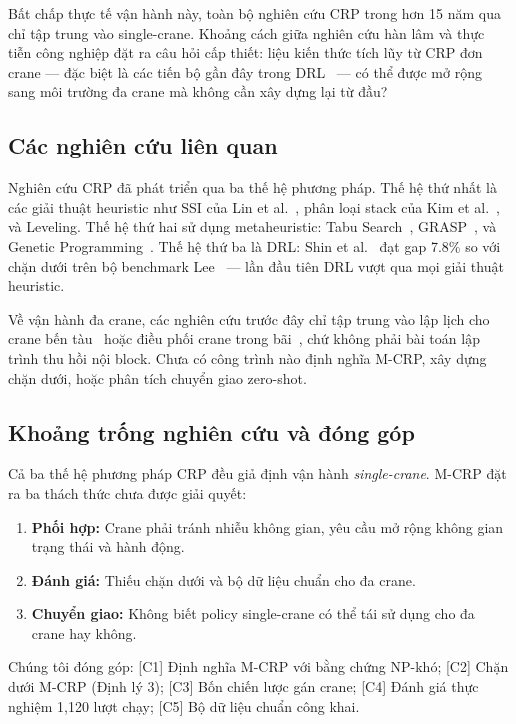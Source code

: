 \documentclass[11pt,a4paper]{elsarticle}
\begin{document}
Bất chấp thực tế vận hành này, toàn bộ nghiên cứu CRP trong hơn 15 năm qua chỉ tập trung vào single-crane. Khoảng cách giữa nghiên cứu hàn lâm và thực tiễn công nghiệp đặt ra câu hỏi cấp thiết: liệu kiến thức tích lũy từ CRP đơn crane — đặc biệt là các tiến bộ gần đây trong DRL~\cite{shin2026} — có thể được mở rộng sang môi trường đa crane mà không cần xây dựng lại từ đầu?

\subsection{Các nghiên cứu liên quan}
Nghiên cứu CRP đã phát triển qua ba thế hệ phương pháp. Thế hệ thứ nhất là các giải thuật heuristic như SSI của Lin et al.~\cite{lin2015}, phân loại stack của Kim et al.~\cite{kim2016}, và Leveling. Thế hệ thứ hai sử dụng metaheuristic: Tabu Search~\cite{forster2012}, GRASP~\cite{cifuentes2020}, và Genetic Programming~\cite{durasevic2025}. Thế hệ thứ ba là DRL: Shin et al.~\cite{shin2026} đạt gap 7.8\% so với chặn dưới trên bộ benchmark Lee~\cite{lee2010} — lần đầu tiên DRL vượt qua mọi giải thuật heuristic.

Về vận hành đa crane, các nghiên cứu trước đây chỉ tập trung vào lập lịch cho crane bến tàu~\cite{sammarra2007} hoặc điều phối crane trong bãi~\cite{zhang2002}, chứ không phải bài toán lập trình thu hồi nội block. Chưa có công trình nào định nghĩa M-CRP, xây dựng chặn dưới, hoặc phân tích chuyển giao zero-shot.

\subsection{Khoảng trống nghiên cứu và đóng góp}
Cả ba thế hệ phương pháp CRP đều giả định vận hành \emph{single-crane}. M-CRP đặt ra ba thách thức chưa được giải quyết:
\begin{enumerate}
    \item \textbf{Phối hợp:} Crane phải tránh nhiễu không gian, yêu cầu mở rộng không gian trạng thái và hành động.
    \item \textbf{Đánh giá:} Thiếu chặn dưới và bộ dữ liệu chuẩn cho đa crane.
    \item \textbf{Chuyển giao:} Không biết policy single-crane có thể tái sử dụng cho đa crane hay không.
\end{enumerate}

Chúng tôi đóng góp: [C1] Định nghĩa M-CRP với bằng chứng NP-khó; [C2] Chặn dưới M-CRP (Định lý 3); [C3] Bốn chiến lược gán crane; [C4] Đánh giá thực nghiệm 1,120 lượt chạy; [C5] Bộ dữ liệu chuẩn công khai.
\end{document}
